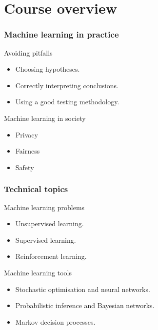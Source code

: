 \documentclass{beamer}
\begin{document}
\section{Course overview}

\begin{frame}
  \frametitle{Machine learning in practice}
  \begin{block}{Avoiding pitfalls}
    \begin{itemize}
    \item Choosing hypotheses.
    \item Correctly interpreting conclusions.
    \item Using a good testing methodology.
    \end{itemize}
  \end{block}
  \begin{block}{Machine learning in society}
    \begin{itemize}
    \item<alert@2> Privacy 
    \item<alert@3> Fairness 
    \item<alert@4> Safety 
    \end{itemize}
  \end{block}
\end{frame}


\begin{frame}
  \frametitle{Technical topics}

  \begin{block}{Machine learning problems}
    \begin{itemize}
    \item Unsupervised learning.
    \item Supervised learning.
    \item Reinforcement learning.
    \end{itemize}
  \end{block}

  \begin{block}{Machine learning tools}
    \begin{itemize}
    \item Stochastic optimisation and neural networks.
    \item Probabilistic inference and Bayesian networks.
    \item Markov decision processes.
    \end{itemize}
  \end{block}
\end{frame}
\end{document}

